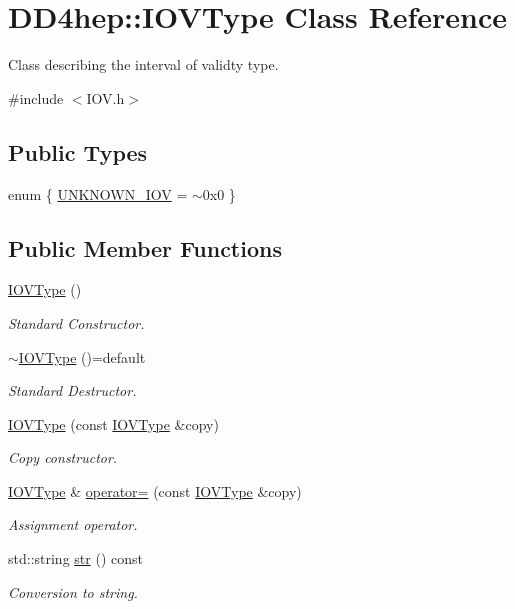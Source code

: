 \hypertarget{class_d_d4hep_1_1_i_o_v_type}{}\section{D\+D4hep\+:\+:I\+O\+V\+Type Class Reference}
\label{class_d_d4hep_1_1_i_o_v_type}


Class describing the interval of validty type.  




{\ttfamily \#include $<$I\+O\+V.\+h$>$}

\subsection*{Public Types}
\begin{DoxyCompactItemize}
\item 
enum \{ \hyperlink{class_d_d4hep_1_1_i_o_v_type_acef1483c5ce503d44367cf75875c5797aa035632674476d28a4b2a6445303c220}{U\+N\+K\+N\+O\+W\+N\+\_\+\+I\+OV} = $\sim$0x0
 \}
\end{DoxyCompactItemize}
\subsection*{Public Member Functions}
\begin{DoxyCompactItemize}
\item 
\hyperlink{class_d_d4hep_1_1_i_o_v_type_aa45116fda61d8214bcf0f83dcac1e9f6}{I\+O\+V\+Type} ()
\begin{DoxyCompactList}\small\item\em Standard Constructor. \end{DoxyCompactList}\item 
\hyperlink{class_d_d4hep_1_1_i_o_v_type_a4768c73cc2f4781beb2d2e57dd2c1b84}{$\sim$\+I\+O\+V\+Type} ()=default
\begin{DoxyCompactList}\small\item\em Standard Destructor. \end{DoxyCompactList}\item 
\hyperlink{class_d_d4hep_1_1_i_o_v_type_a89eb725303b66a7a2a3b2198f96a4913}{I\+O\+V\+Type} (const \hyperlink{class_d_d4hep_1_1_i_o_v_type}{I\+O\+V\+Type} \&copy)
\begin{DoxyCompactList}\small\item\em Copy constructor. \end{DoxyCompactList}\item 
\hyperlink{class_d_d4hep_1_1_i_o_v_type}{I\+O\+V\+Type} \& \hyperlink{class_d_d4hep_1_1_i_o_v_type_a7c7f28fc3cd9f5f32ba33cdd5c12a43a}{operator=} (const \hyperlink{class_d_d4hep_1_1_i_o_v_type}{I\+O\+V\+Type} \&copy)
\begin{DoxyCompactList}\small\item\em Assignment operator. \end{DoxyCompactList}\item 
std\+::string \hyperlink{class_d_d4hep_1_1_i_o_v_type_aaa285e7ab61a0beb5613f2413d4acbf2}{str} () const
\begin{DoxyCompactList}\small\item\em Conversion to string. \end{DoxyCompactList}\end{DoxyCompactItemize}
